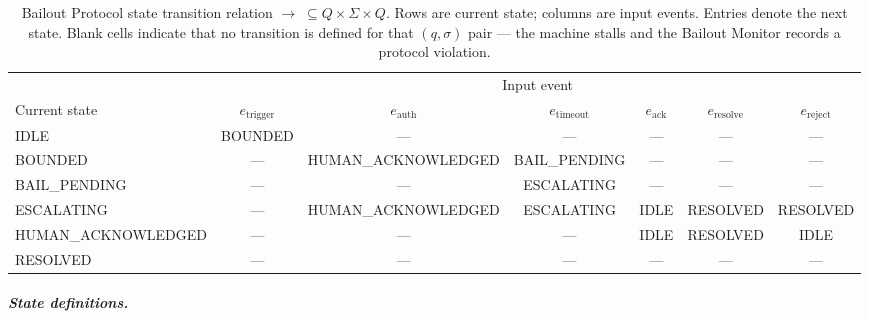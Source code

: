 \begin{table}[htbp]
\caption{Bailout Protocol state transition relation $\rightarrow\;\subseteq Q \times \Sigma \times Q$. Rows are current state; columns are input events. Entries denote the next state. Blank cells indicate that no transition is defined for that $(q, \sigma)$ pair — the machine stalls and the Bailout Monitor records a protocol violation.}
\label{tab:bailout-transition}
\begin{tabular}{@{}lcccccc@{}}
\toprule
 & \multicolumn{6}{c}{Input event} \\
\cmidrule(l){2-7}
Current state & $e_{\text{trigger}}$ & $e_{\text{auth}}$ & $e_{\text{timeout}}$ & $e_{\text{ack}}$ & $e_{\text{resolve}}$ & $e_{\text{reject}}$ \\
\midrule
IDLE          & BOUNDED             & —                 & —                   & —                & —                   & —                 \\
BOUNDED       & —                   & HUMAN\_ACKNOWLEDGED & BAIL\_PENDING       & —                & —                   & —                 \\
BAIL\_PENDING & —                   & —                 & ESCALATING          & —                & —                   & —                 \\
ESCALATING    & —                   & HUMAN\_ACKNOWLEDGED & ESCALATING         & IDLE             & RESOLVED            & RESOLVED          \\
HUMAN\_ACKNOWLEDGED & —           & —                 & —                   & IDLE             & RESOLVED            & IDLE              \\
RESOLVED      & —                   & —                 & —                   & —                & —                   & —                 \\
\bottomrule
\end{tabular}
\end{table}

\subparagraph{State definitions.}

